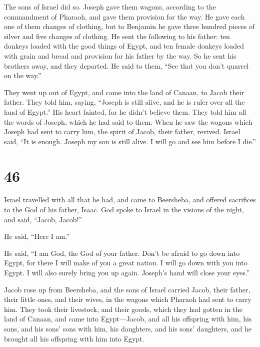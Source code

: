  The sons of Israel did so. Joseph gave them wagons,
according to the commandment of Pharaoh, and gave them provision for the
way.  He gave each one of them changes of clothing, but
to Benjamin he gave three hundred pieces of silver and five changes of
clothing.  He sent the following to his father: ten
donkeys loaded with the good things of Egypt, and ten female donkeys
loaded with grain and bread and provision for his father by the way.
 So he sent his brothers away, and they departed. He said
to them, ``See that you don't quarrel on the way.''

 They went up out of Egypt, and came into the land of
Canaan, to Jacob their father.  They told him, saying,
``Joseph is still alive, and he is ruler over all the land of Egypt.''
His heart fainted, for he didn't believe them.  They told
him all the words of Joseph, which he had said to them. When he saw the
wagons which Joseph had sent to carry him, the spirit of Jacob, their
father, revived.  Israel said, ``It is enough. Joseph my
son is still alive. I will go and see him before I die.''

\hypertarget{section-45}{%
\section{46}\label{section-45}}

 Israel travelled with all that he had, and came to
Beersheba, and offered sacrifices to the God of his father, Isaac.
 God spoke to Israel in the visions of the night, and
said, ``Jacob, Jacob!''

He said, ``Here I am.''

 He said, ``I am God, the God of your father. Don't be
afraid to go down into Egypt, for there I will make of you a great
nation.  I will go down with you into Egypt. I will also
surely bring you up again. Joseph's hand will close your eyes.''

 Jacob rose up from Beersheba, and the sons of Israel
carried Jacob, their father, their little ones, and their wives, in the
wagons which Pharaoh had sent to carry him.  They took
their livestock, and their goods, which they had gotten in the land of
Canaan, and came into Egypt---Jacob, and all his offspring with him,
 his sons, and his sons' sons with him, his daughters, and
his sons' daughters, and he brought all his offspring with him into
Egypt.

